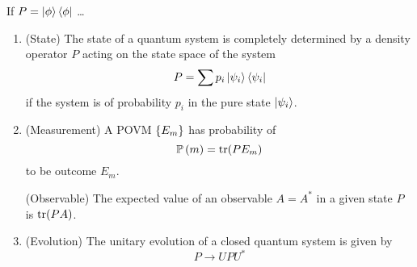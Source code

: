 \begin{example}
    If $P = \left|\phi\right\rangle\left\langle \phi\right|$ \dots %
\end{example}

\begin{enumerate}[label=Postulate \arabic*]
    \item (State) The state of a quantum system is completely determined by a density
          operator $P$ acting on the state space of the system
          \[P = \sum p_i\left|\psi_i\right\rangle\left\langle \psi_i\right|\]
          if the system is of probability $p_i$ in the pure state $\left|\psi_i\right\rangle$.
    \item (Measurement) A POVM $\left\lbrace E_m\right\rbrace$ has probability of
          \[\prob{m} = \trace(PE_m)\]
          to be outcome $E_m$.

          (Observable) The expected value of an observable $A = A^*$ in a given
          state $P$ is $\operatorname{tr}(PA)$.
    \item (Evolution) The unitary evolution of a closed quantum system is
          given by \[P \to UPU^*\]
\end{enumerate}